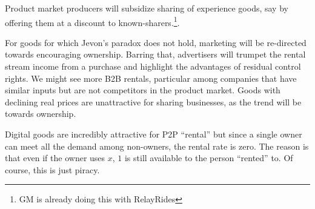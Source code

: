 \documentclass[11pt]{article}
\begin{document}
Product market producers will subsidize sharing of experience goods, say by offering them at a discount to known-sharers.\footnote{GM is already doing this with RelayRides}.  

For goods for which Jevon's paradox does not hold, marketing will be re-directed towards encouraging ownership.
Barring that, advertisers will trumpet the rental stream income from a purchase and highlight the advantages of residual control rights. 
We might see more B2B rentals, particular among companies that have similar inputs but are not competitors in the product market. 
Goods with declining real prices are unattractive for sharing businesses, as the trend will be towards ownership. 

Digital goods are incredibly attractive for P2P ``rental'' but since a single owner can meet all the demand among non-owners, the rental rate is zero.
The reason is that even if the owner uses $x$, $1$ is still available to the person ``rented'' to.  
Of course, this is just piracy. 


\cite{sinai2005}
\cite{ikkala2014defining}
\cite{varian2000} 
\cite{byers2013rise} 
\cite{becker1965theory} 



\end{document}
